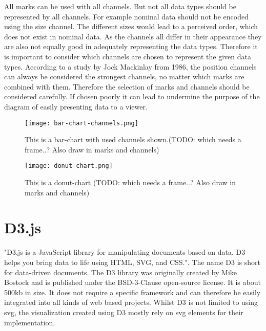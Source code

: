 All marks can be used with all channels. But not all data types should be represented by all channels. For example nominal data should not be encoded using the size channel. The different sizes would lead to a perceived order, which does not exist in nominal data. As the channels all differ in their appearance they are also not equally good in adequately representing the data types. Therefore it is important to consider which channels are chosen to represent the given data types.  According to a study by Jock Mackinlay from 1986, the position channels can always be considered the strongest channels, no matter which marks are combined with them\cite{mackinlay1986automating}. Therefore the selection of marks and channels should be considered carefully. If chosen poorly it can lead to undermine the purpose of the diagram of easily presenting data to a viewer.


\begin{figure}
    \label{fig:bar-chart}
    \texttt{[image: bar-chart-channels.png]}
    \caption[bar-chart]{This is a bar-chart with used channels shown.(TODO: which needs a frame..? Also draw in marks and channels)}
\end{figure}

\begin{figure}
    \label{fig:donut-chart}
    \texttt{[image: donut-chart.png]}
    \caption[donut-chart]{This is a donut-chart (TODO: which needs a frame..? Also draw in marks and channels)}
\end{figure}

\section{D3.js}

"D3.js is a JavaScript library for manipulating documents based on data. D3 helps you bring data to life using HTML, SVG, and CSS."\cite{d3js}. The name D3 is short for data-driven documents. The D3 library was originally created by Mike Bostock and is published under the BSD-3-Clause open-source license. It is about 500kb in size. It does not require a specific framework and can therefore be easily integrated into all kinds of web based projects. Whilst D3 is not limited to using svg, the visualization created using D3 mostly rely on svg elements for their implementation.

